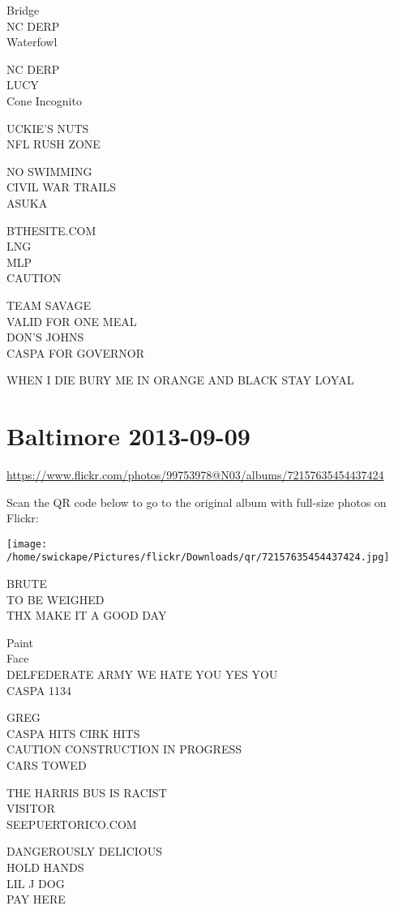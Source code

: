 \documentclass[10pt,letterpaper]{article}
\begin{document}
Bridge\\
NC DERP\\
Waterfowl

NC DERP\\
LUCY\\
Cone Incognito

UCKIE'S NUTS\\
NFL RUSH ZONE

NO SWIMMING\\
CIVIL WAR TRAILS\\
ASUKA

BTHESITE.COM\\
LNG\\
MLP\\
CAUTION

TEAM SAVAGE\\
VALID FOR ONE MEAL\\
DON'S JOHNS\\
CASPA FOR GOVERNOR

WHEN I DIE BURY ME IN ORANGE AND BLACK STAY LOYAL


\section*{Baltimore 2013-09-09}

\url{https://www.flickr.com/photos/99753978@N03/albums/72157635454437424}

Scan the QR code below to go to the original album with full-size photos on Flickr:

\texttt{[image: /home/swickape/Pictures/flickr/Downloads/qr/72157635454437424.jpg]}


BRUTE\\
TO BE WEIGHED\\
THX MAKE IT A GOOD DAY

Paint\\
Face\\
DELFEDERATE ARMY WE HATE YOU YES YOU\\
CASPA 1134

GREG\\
CASPA HITS CIRK HITS\\
CAUTION CONSTRUCTION IN PROGRESS\\
CARS TOWED

THE HARRIS BUS IS RACIST\\
VISITOR\\
SEEPUERTORICO.COM

DANGEROUSLY DELICIOUS\\
HOLD HANDS\\
LIL J DOG\\
PAY HERE
\end{document}
